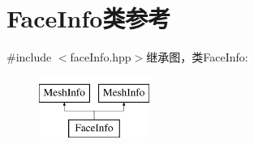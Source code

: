 \hypertarget{classFaceInfo}{
\section{FaceInfo类参考}
\label{classFaceInfo}
}


{\ttfamily \#include $<$faceInfo.hpp$>$}继承图，类FaceInfo:\begin{figure}[H]
\begin{center}
\leavevmode
\includegraphics[height=2cm]{classFaceInfo}
\end{center}
\end{figure}
